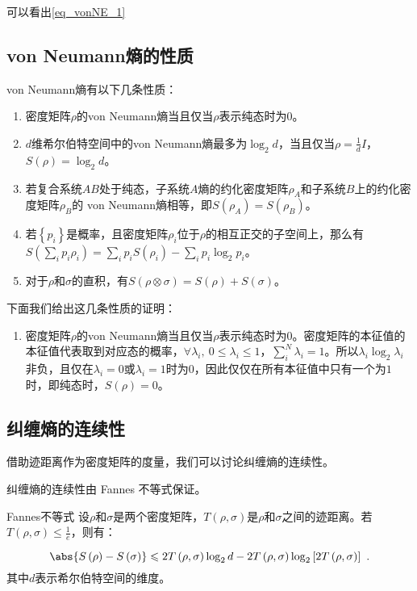 可以看出\autoref{eq_vonNE_1} 


\subsection{von Neumann熵的性质}

von Neumann熵有以下几条性质：

\begin{enumerate}
\item 密度矩阵$\rho$的von Neumann熵当且仅当$\rho$表示纯态时为0。
\item $d$维希尔伯特空间中的von Neumann熵最多为$\log_2 d$，当且仅当$\rho = \frac{1}{d}I$，$S(\rho) = \log_2 d$。
\item 若复合系统$AB$处于纯态，子系统$A$熵的约化密度矩阵$\rho_A$和子系统$B$上的约化密度矩阵$\rho_B$的 von Neumann熵相等，即$S\left(\rho_A\right) = S\left(\rho_B\right)$。
\item 若$\left\{p_i\right\}$是概率，且密度矩阵$\rho_i$位于$\rho$的相互正交的子空间上，那么有$S\left(\sum\limits_ip_i\rho_i\right) = \sum\limits_ip_iS\left(\rho_i\right) - \sum\limits_ip_i\log_2p_i$。
\item 对于$\rho$和$\sigma$的直积，有$S\left(\rho\otimes\sigma\right) = S\left(\rho\right) + S\left(\sigma\right)$。
\end{enumerate}

下面我们给出这几条性质的证明：

\begin{enumerate}
\item 密度矩阵$\rho$的von Neumann熵当且仅当$\rho$表示纯态时为0。密度矩阵的本征值的本征值代表取到对应态的概率，$\forall \lambda_i ,~ 0\leqslant \lambda_i \leqslant1$，$\sum_i^N \lambda_i = 1$。所以$\lambda_i \log_2 \lambda_i$非负，且仅在$\lambda_i = 0$或$\lambda_i = 1$时为$0$，因此仅仅在所有本征值中只有一个为$1$时，即纯态时，$S\left(\rho\right) = 0$。
\end{enumerate}


\subsection{纠缠熵的连续性}

借助迹距离作为密度矩阵的度量，我们可以讨论纠缠熵的连续性。

纠缠熵的连续性由 Fannes 不等式保证。

\begin{theorem}{Fannes不等式}
设$\rho$和$\sigma$是两个密度矩阵，$T\left(\rho,\sigma\right)$是$\rho$和$\sigma$之间的迹距离。若$T\left(\rho,\sigma\right) \leqslant \frac{1}{e}$，则有：

\begin{equation}
\abs{S\left(\rho\right) - S\left(\sigma\right)} \leqslant 2T\left(\rho,\sigma\right)\log_2 d - 2T\left(\rho,\sigma\right) \log_2\left[ 2 T\left(\rho,\sigma\right)\right]~.
\end{equation}
其中$d$表示希尔伯特空间的维度。

\end{theorem}

